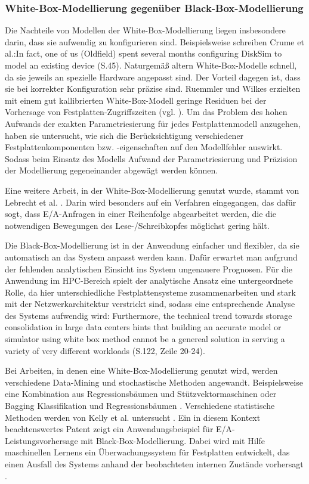 \documentclass[
	12pt,
	a4paper,
	BCOR10mm,
	DIV14,
	listof=totoc,
	bibliography=totoc,
	headsepline
]{scrreprt}
\begin{document}
\subsubsection{White-Box-Modellierung gegenüber Black-Box-Modellierung}
Die Nachteile von Modellen der White-Box-Modellierung liegen insbesondere darin, dass sie aufwendig zu konfigurieren sind. Beispielsweise schreiben Crume et al.:\glqq In fact, one of us (Oldfield) spent several months configuring DiskSim to model an existing device\grqq{} \cite{Crume:2013:FML:2538542.2538561} (S.45). Naturgemäß altern White-Box-Modelle schnell, da sie jeweils an spezielle Hardware angepasst sind. Der Vorteil dagegen ist, dass sie bei korrekter Konfiguration sehr präzise sind. Ruemmler und Wilkes erzielten mit einem gut kallibrierten White-Box-Modell geringe Residuen bei der Vorhersage von Festplatten-Zugriffszeiten (vgl. \cite{Ruemmler94anintroduction}). Um das Problem des hohen Aufwands der exakten Parametriesierung für jedes Festplattenmodell anzugehen, haben sie untersucht, wie sich die Berücksichtigung verschiedener Festplattenkomponenten bzw. -eigenschaften auf den Modellfehler auswirkt. Sodass beim Einsatz des Modells Aufwand der Parametriesierung und Präzision der Modellierung gegeneinander abgewägt werden können.

Eine weitere Arbeit, in der White-Box-Modellierung genutzt wurde, stammt von Lebrecht et al. \cite{Lebrecht:2009:10.1109/QEST.2009.31}. Darin wird besonders auf ein Verfahren eingegangen, das dafür sogt, dass E/A-Anfragen in einer Reihenfolge abgearbeitet werden, die die notwendigen Bewegungen des Lese-/Schreibkopfes möglichst gering hält.
\medskip

Die Black-Box-Modellierung ist in der Anwendung einfacher und flexibler, da sie automatisch an das System anpasst werden kann. Dafür erwartet man aufgrund der fehlenden analytischen Einsicht ins System ungenauere Prognosen. Für die Anwendung im HPC-Bereich spielt der analytische Ansatz eine untergeordnete Rolle, da hier unterschiedliche Festplattensysteme zusammenarbeiten und stark mit der Netzwerkarchitektur verstrickt sind, sodass eine entsprechende Analyse des Systems aufwendig wird: \glqq Furthermore, the technical trend towards storage consolidation in large data centers hints that building an accurate model or simulator using white box method cannot be a genereal solution in serving a variety of very different workloads\grqq{} \cite{DBLP:conf/npc/ZhangLZJC10} (S.122, Zeile 20-24).

Bei Arbeiten, in denen eine White-Box-Modellierung genutzt wird, werden verschiedene Data-Mining und stochastische Methoden angewandt. Beispielsweise eine Kombination aus Regressionsbäumen und Stützvektormaschinen \cite{Dai:2012:SDP:2477169.2477214} oder Bagging Klassifikation und Regressionsbäumen \cite{DBLP:conf/npc/ZhangLZJC10}. Verschiedene statistische Methoden werden von Kelly et al. untersucht \cite{Kelly04inducingmodels}.
Ein in diesem Kontext beachtenswertes Patent zeigt ein Anwendungsbeispiel für E/A-Leistungsvorhersage mit Black-Box-Modellierung. Dabei wird mit Hilfe maschinellen Lernens ein Überwachungssystem für Festplatten entwickelt, das einen Ausfall des Systems anhand der beobachteten internen Zustände vorhersagt \cite{gough2012predicting}. 
\end{document}
